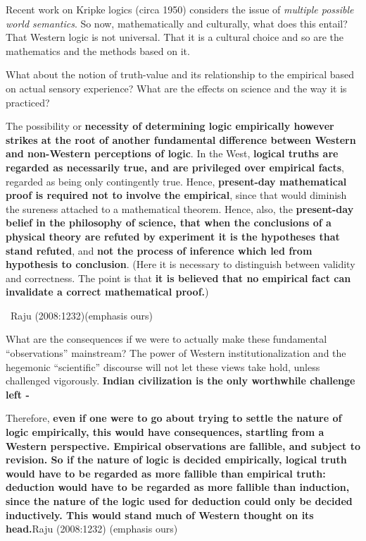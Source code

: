Recent work on Kripke logics (circa 1950) considers the issue of \textit{multiple possible world semantics}. So now, mathematically and culturally, what does this entail? That Western logic is not universal. That it is a cultural choice and so are the mathematics and the methods based on it.

What about the notion of truth-value and its relationship to the empirical based on actual sensory experience? What are the effects on science and the way it is practiced?

\begin{myquote}
The possibility or \textbf{necessity of determining logic empirically however strikes at the root of another fundamental difference between Western and non-Western perceptions of logic}. In the West, \textbf{logical truths are regarded as necessarily true, and are privileged over empirical facts}, regarded as being only contingently true. Hence, \textbf{present-day mathematical proof is required not to involve the empirical}, since that would diminish the sureness attached to a mathematical theorem. Hence, also, the \textbf{present-day belief in the philosophy of science, that when the conclusions of a physical theory are refuted by experiment it is the hypotheses that stand refuted}, and \textbf{not the process of inference which led from hypothesis to conclusion}. (Here it is necessary to distinguish between validity and correctness. The point is that \textbf{it is believed that no empirical fact can invalidate a correct mathematical proof.})

~\hfill Raju (2008:1232)(emphasis ours)
\end{myquote}

What are the consequences if we were to actually make these fundamental “observations” mainstream? The power of Western institutionalization and the hegemonic “scientific” discourse will not let these views take hold, unless challenged vigorously. \textbf{Indian civilization is the only worthwhile challenge left -}

\begin{myquote}
Therefore, \textbf{even if one were to go about trying to settle the nature of logic empirically, this would have consequences, startling from a Western perspective. Empirical observations are fallible, and subject to revision. So if the nature of logic is decided empirically, logical truth would have to be regarded as more fallible than empirical truth: deduction would have to be regarded as more fallible than induction, since the nature of the logic used for deduction could only be decided inductively. This would stand much of Western thought on its head.}\hfill Raju (2008:1232) (emphasis ours)
\end{myquote}

